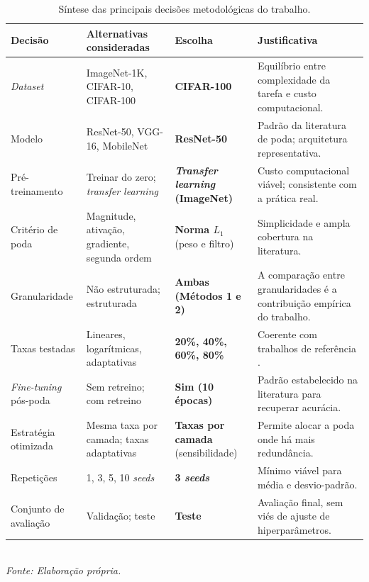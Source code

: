 \begin{table}[htb]
\centering
\caption{Síntese das principais decisões metodológicas do trabalho.}
\label{tab:decisoes_metodologicas}
\small
\begin{tabular}{p{3.0cm} p{3.5cm} p{2.8cm} p{4.5cm}}
\hline
\textbf{Decisão} & \textbf{Alternativas consideradas} & \textbf{Escolha} & \textbf{Justificativa} \\
\hline

\textit{Dataset}
& ImageNet-1K, CIFAR-10, CIFAR-100
& \textbf{CIFAR-100}
& Equilíbrio entre complexidade da tarefa e custo computacional. \\

Modelo
& ResNet-50, VGG-16, MobileNet
& \textbf{ResNet-50}
& Padrão da literatura de poda; arquitetura representativa. \\

Pré-treinamento
& Treinar do zero; \textit{transfer learning}
& \textbf{\textit{Transfer learning} (ImageNet)}
& Custo computacional viável; consistente com a prática real. \\

Critério de poda
& Magnitude, ativação, gradiente, segunda ordem
& \textbf{Norma $L_1$} (peso e filtro)
& Simplicidade e ampla cobertura na literatura. \\

Granularidade
& Não estruturada; estruturada
& \textbf{Ambas (Métodos 1 e 2)}
& A comparação entre granularidades é a contribuição empírica do trabalho. \\

Taxas testadas
& Lineares, logarítmicas, adaptativas
& \textbf{20\%, 40\%, 60\%, 80\%}
& Coerente com trabalhos de referência \cite{Han2015,Li2017}. \\

\textit{Fine-tuning} pós-poda
& Sem retreino; com retreino
& \textbf{Sim (10 épocas)}
& Padrão estabelecido na literatura para recuperar acurácia. \\

Estratégia otimizada
& Mesma taxa por camada; taxas adaptativas
& \textbf{Taxas por camada} (sensibilidade)
& Permite alocar a poda onde há mais redundância. \\

Repetições
& 1, 3, 5, 10 \textit{seeds}
& \textbf{3 \textit{seeds}}
& Mínimo viável para média e desvio-padrão. \\

Conjunto de avaliação
& Validação; teste
& \textbf{Teste}
& Avaliação final, sem viés de ajuste de hiperparâmetros. \\

\hline
\end{tabular}\\
\textit{Fonte: Elaboração própria.}
\end{table}

